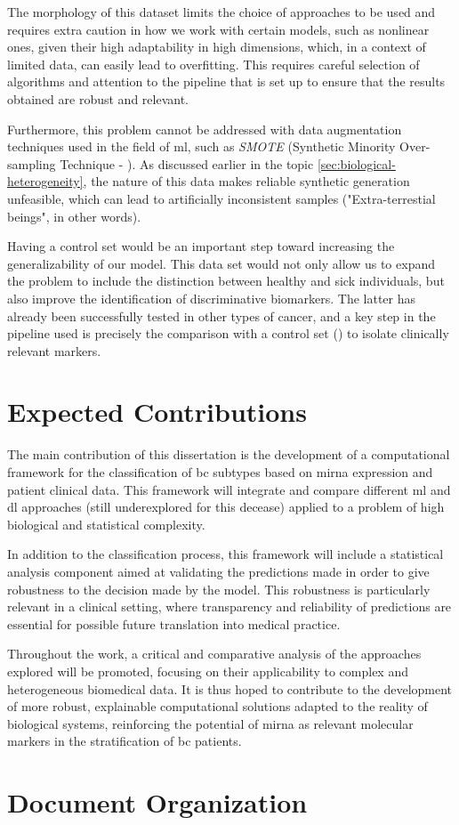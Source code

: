 The morphology of this dataset limits the choice of approaches to be used and
requires extra caution in how we work with certain models, such as nonlinear
ones, given their high adaptability in high dimensions, which, in a context of
limited data, can easily lead to overfitting. This requires careful selection
of algorithms and attention to the pipeline that is set up to ensure that the
results obtained are robust and relevant.

Furthermore, this problem cannot be addressed with data augmentation techniques
used in the field of \gls{ml}, such as \textit{SMOTE} (Synthetic Minority
Over-sampling Technique - \textcite{SMOTE_Blagus2013SMOTE}). As discussed
earlier in the topic \ref{sec:biological-heterogeneity}, the nature of this
data makes reliable synthetic generation unfeasible, which can lead to
artificially inconsistent samples ("Extra-terrestial beings", in other words).

Having a control set would be an important step toward increasing the
generalizability of our model. This data set would not only allow us to expand
the problem to include the distinction between healthy and sick individuals,
but also improve the identification of discriminative biomarkers. The latter
has already been successfully tested in other types of cancer, and a key step
in the pipeline used is precisely the comparison with a control set
(\textcite{ml_gastric_Azari2023}) to isolate clinically relevant markers.

\section{Expected Contributions}
\label{sec:expected-contributions}
The main contribution of this dissertation is the development of a computational
framework for the classification of \gls{bc} subtypes based on \gls{mirna}
expression and patient clinical data. This framework will integrate
and compare different \gls{ml} and \gls{dl} approaches (still underexplored for this decease)
applied to a problem of high biological and statistical complexity.

In addition to the classification process, this framework will include a
statistical analysis component aimed at validating the predictions made in
order to give robustness to the decision made by the model. This robustness is
particularly relevant in a clinical setting, where transparency and reliability
of predictions are essential for possible future translation into medical
practice.

Throughout the work, a critical and comparative analysis of the approaches
explored will be promoted, focusing on their applicability to complex and
heterogeneous biomedical data. It is thus hoped to contribute to the
development of more robust, explainable computational solutions adapted to the
reality of biological systems, reinforcing the potential of \gls{mirna} as
relevant molecular markers in the stratification of \gls{bc} patients.

\section{Document Organization}
\label{sec:document-organization}
